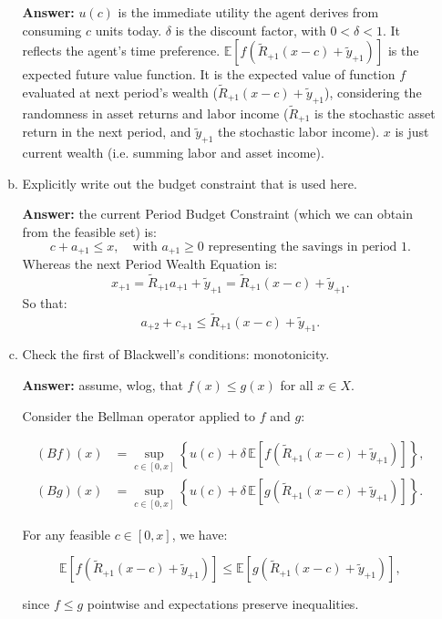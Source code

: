 \documentclass[11pt]{extarticle}
\theoremstyle{plain}
\theoremstyle{definition}
\begin{document}
\begin{enumerate}[(a)]
\begin{enumerate}[(a)]
\textbf{Answer:} $u(c)$ is the immediate utility the agent derives from consuming $c$ units today. $\delta$ is the discount factor, with $0 < \delta < 1$. It reflects the agent's time preference. $\mathbb{E} \left[ f\left( \tilde{R}_{+1}(x - c) + \tilde{y}_{+1} \right) \right]$ is the expected future value function. It is the expected value of function $f$ evaluated at next period's wealth ($\tilde{R}_{+1}(x - c) + \tilde{y}_{+1}$), considering the randomness in asset returns and labor income ($\tilde{R}_{+1}$ is the stochastic asset return in the next period, and $\tilde{y}_{+1}$ the stochastic labor income). $x$ is just current wealth (i.e. summing labor and asset income).


\item Explicitly write out the budget constraint that is used here.

\textbf{Answer:} the current Period Budget Constraint (which we can obtain from the feasible set) is:
   \[
   c + a_{+1} \leq x, \quad \text{with } a_{+1} \geq 0 \text{ representing the savings in period 1}.
   \]
Whereas the next Period Wealth Equation is:
   \[
   x_{+1} = \tilde{R}_{+1} a_{+1} + \tilde{y}_{+1} = \tilde{R}_{+1}(x - c) + \tilde{y}_{+1}.
   \]
So that:
\[
   a_{+2} + c_{+1} \leq \tilde{R}_{+1}(x - c) + \tilde{y}_{+1}.
\]

\item Check the first of Blackwell's conditions: monotonicity.

\textbf{Answer:} assume, wlog, that $f(x) \leq g(x)$ for all $x \in X$.

Consider the Bellman operator applied to $f$ and $g$:

\[
\begin{aligned}
(Bf)(x) &= \sup_{c \in [0, x]} \left\{ u(c) + \delta \, \mathbb{E} \left[ f\left( \tilde{R}_{+1}(x - c) + \tilde{y}_{+1} \right) \right] \right\}, \\
(Bg)(x) &= \sup_{c \in [0, x]} \left\{ u(c) + \delta \, \mathbb{E} \left[ g\left( \tilde{R}_{+1}(x - c) + \tilde{y}_{+1} \right) \right] \right\}.
\end{aligned}
\]

For any feasible $c \in [0, x]$, we have:

\[
\mathbb{E} \left[ f\left( \tilde{R}_{+1}(x - c) + \tilde{y}_{+1} \right) \right] \leq \mathbb{E} \left[ g\left( \tilde{R}_{+1}(x - c) + \tilde{y}_{+1} \right) \right],
\]

since $f \leq g$ pointwise and expectations preserve inequalities.


\end{enumerate}
\end{enumerate}
\end{document}
